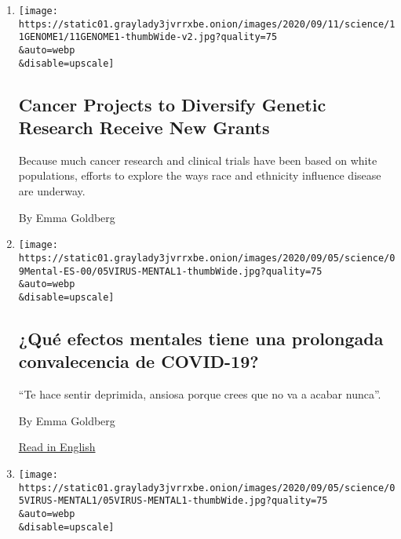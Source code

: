 \begin{enumerate}
\def\labelenumi{\arabic{enumi}.}
\item
  \href{/2020/09/11/science/genetic-cancer-research-race.html}{}

  \texttt{[image: https://static01.graylady3jvrrxbe.onion/images/2020/09/11/science/11GENOME1/11GENOME1-thumbWide-v2.jpg?quality=75\\\&auto=webp\\\&disable=upscale]}

  \hypertarget{cancer-projects-to-diversify-genetic-research-receive-new-grants}{%
  \subsection{Cancer Projects to Diversify Genetic Research Receive New
  Grants}\label{cancer-projects-to-diversify-genetic-research-receive-new-grants}}

  Because much cancer research and clinical trials have been based on
  white populations, efforts to explore the ways race and ethnicity
  influence disease are underway.

  By Emma Goldberg
\item
  \href{/es/2020/09/09/espanol/ciencia-y-tecnologia/salud-mental-coronavirus.html}{}

  \texttt{[image: https://static01.graylady3jvrrxbe.onion/images/2020/09/05/science/09Mental-ES-00/05VIRUS-MENTAL1-thumbWide.jpg?quality=75\\\&auto=webp\\\&disable=upscale]}

  \hypertarget{quuxe9-efectos-mentales-tiene-una-prolongada-convalecencia-de-covid-19}{%
  \subsection{¿Qué efectos mentales tiene una prolongada convalecencia
  de
  COVID-19?}\label{quuxe9-efectos-mentales-tiene-una-prolongada-convalecencia-de-covid-19}}

  ``Te hace sentir deprimida, ansiosa porque crees que no va a acabar
  nunca''.

  By Emma Goldberg

  \href{https://www.nytimes3xbfgragh.onion/2020/09/07/health/coronavirus-mental-health-long-hauler.html}{Read
  in English}
\item
  \href{/2020/09/07/health/coronavirus-mental-health-long-hauler.html}{}

  \texttt{[image: https://static01.graylady3jvrrxbe.onion/images/2020/09/05/science/05VIRUS-MENTAL1/05VIRUS-MENTAL1-thumbWide.jpg?quality=75\\\&auto=webp\\\&disable=upscale]}


\end{enumerate}
